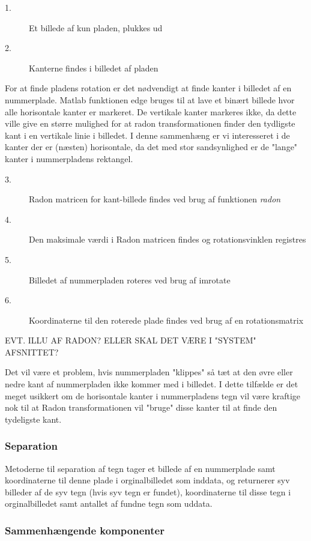 \begin{description}
\item[1.] Et billede af kun pladen, plukkes ud
\item[2.] Kanterne findes i billedet af pladen
\end{description}
For at finde pladens rotation er det nødvendigt at finde kanter i billedet af en nummerplade. Matlab funktionen edge bruges til at lave et binært billede hvor alle horisontale kanter er markeret. De vertikale kanter markeres ikke, da dette ville give en større mulighed for at radon transformationen finder den tydligste kant i en vertikale linie i billedet. I denne sammenhæng er vi interesseret i de kanter der er (næsten) horisontale, da det med stor sandsynlighed er de "lange" kanter i nummerpladens rektangel.

\begin{description}
\item[3.] Radon matricen for kant-billede findes ved brug af funktionen \textit{radon}
\item[4.] Den maksimale værdi i Radon matricen findes og rotationsvinklen registres
\item[5.] Billedet af nummerpladen roteres ved brug af imrotate
\item[6.] Koordinaterne til den roterede plade findes ved brug af en rotationsmatrix
\end{description}

EVT. ILLU AF RADON? ELLER SKAL DET VÆRE I "SYSTEM" AFSNITTET?

Det vil være et problem, hvis nummerpladen "klippes" så tæt at den øvre eller nedre kant af nummerpladen ikke kommer med i billedet. I dette tilfælde er det meget usikkert om de horisontale kanter i nummerpladens tegn vil være kraftige nok til at Radon transformationen vil "bruge" disse kanter til at finde den tydeligste kant.

\subsubsection{Separation}

Metoderne til separation af tegn tager et billede af en nummerplade samt koordinaterne til denne plade i orginalbilledet som inddata, og returnerer syv billeder af de syv tegn (hvis syv tegn er fundet), koordinaterne til disse tegn i orginalbilledet samt antallet af fundne tegn som uddata.

\subsubsection*{Sammenhængende komponenter}

